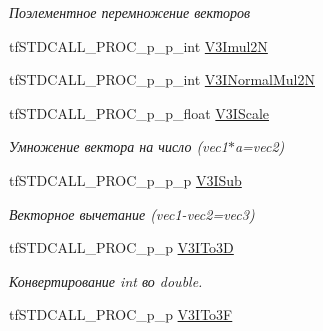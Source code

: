 \begin{DoxyCompactItemize}
\begin{DoxyCompactList}\small\item\em Поэлементное перемножение векторов \end{DoxyCompactList}\item 
tf\-S\-T\-D\-C\-A\-L\-L\-\_\-\-P\-R\-O\-C\-\_\-p\-\_\-p\-\_\-int \hyperlink{structs_functions_vector_c_p_u_a06617c4d648abd746115f162f9dcc3c5}{V3\-Imul2\-N}
\item 
tf\-S\-T\-D\-C\-A\-L\-L\-\_\-\-P\-R\-O\-C\-\_\-p\-\_\-p\-\_\-int \hyperlink{structs_functions_vector_c_p_u_a13d5662d41fed51dac5ccf8c799a1427}{V3\-I\-Normal\-Mul2\-N}
\item 
\hypertarget{structs_functions_vector_c_p_u_ac2f61fe1a0840b37766277137b036d10}{tf\-S\-T\-D\-C\-A\-L\-L\-\_\-\-P\-R\-O\-C\-\_\-p\-\_\-p\-\_\-float \hyperlink{structs_functions_vector_c_p_u_ac2f61fe1a0840b37766277137b036d10}{V3\-I\-Scale}}\label{structs_functions_vector_c_p_u_ac2f61fe1a0840b37766277137b036d10}

\begin{DoxyCompactList}\small\item\em Умножение вектора на число (vec1$\ast$a=vec2) \end{DoxyCompactList}\item 
\hypertarget{structs_functions_vector_c_p_u_a3b618017301af456f5bc3ee6785ae186}{tf\-S\-T\-D\-C\-A\-L\-L\-\_\-\-P\-R\-O\-C\-\_\-p\-\_\-p\-\_\-p \hyperlink{structs_functions_vector_c_p_u_a3b618017301af456f5bc3ee6785ae186}{V3\-I\-Sub}}\label{structs_functions_vector_c_p_u_a3b618017301af456f5bc3ee6785ae186}

\begin{DoxyCompactList}\small\item\em Векторное вычетание (vec1-\/vec2=vec3) \end{DoxyCompactList}\item 
\hypertarget{structs_functions_vector_c_p_u_af3edc3b6798be5ce047ee9019ad872fa}{tf\-S\-T\-D\-C\-A\-L\-L\-\_\-\-P\-R\-O\-C\-\_\-p\-\_\-p \hyperlink{structs_functions_vector_c_p_u_af3edc3b6798be5ce047ee9019ad872fa}{V3\-I\-To3\-D}}\label{structs_functions_vector_c_p_u_af3edc3b6798be5ce047ee9019ad872fa}

\begin{DoxyCompactList}\small\item\em Конвертирование int во double. \end{DoxyCompactList}\item 
\hypertarget{structs_functions_vector_c_p_u_aac0a746eb43800d2779e5387d92c26d9}{tf\-S\-T\-D\-C\-A\-L\-L\-\_\-\-P\-R\-O\-C\-\_\-p\-\_\-p \hyperlink{structs_functions_vector_c_p_u_aac0a746eb43800d2779e5387d92c26d9}{V3\-I\-To3\-F}}\label{structs_functions_vector_c_p_u_aac0a746eb43800d2779e5387d92c26d9}


\end{DoxyCompactItemize}
